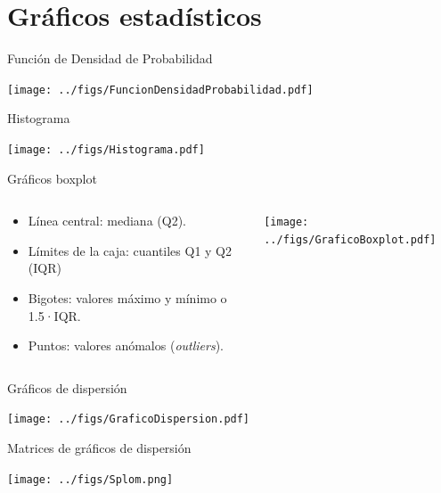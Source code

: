 \documentclass[aspectratio=169, usenames,svgnames,dvipsnames]{beamer}
\begin{document}
\section{Gráficos estadísticos}
\label{sec:org90610a4}


\begin{frame}[label={sec:orgdd805aa}]{Función de Densidad de Probabilidad}
\begin{center}
\texttt{[image: ../figs/FuncionDensidadProbabilidad.pdf]}
\end{center}
\end{frame}

\begin{frame}[label={sec:org843828f}]{Histograma}
\begin{center}
\texttt{[image: ../figs/Histograma.pdf]}
\end{center}
\end{frame}


\begin{frame}[label={sec:org14eb7e4}]{Gráficos boxplot}
\begin{columns}
\begin{column}{0.5\columnwidth}
\begin{itemize}
\item Línea central: mediana (Q2).
\item Límites de la caja: cuantiles Q1 y Q2 (IQR)
\item Bigotes: valores máximo y mínimo o 1.5·IQR.
\item Puntos: valores anómalos (\emph{outliers}).
\end{itemize}
\end{column}

\begin{column}{0.5\columnwidth}
\begin{center}
\texttt{[image: ../figs/GraficoBoxplot.pdf]}
\end{center}
\end{column}
\end{columns}
\end{frame}

\begin{frame}[label={sec:orgbf3bd7f}]{Gráficos de dispersión}
\begin{center}
\texttt{[image: ../figs/GraficoDispersion.pdf]}
\end{center}
\end{frame}


\begin{frame}[label={sec:orgd3ccf0b}]{Matrices de gráficos de dispersión}
\begin{center}
\texttt{[image: ../figs/Splom.png]}
\end{center}
\end{frame}
\end{document}
